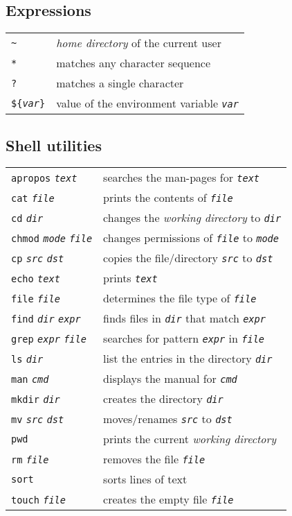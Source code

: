 \documentclass[landscape, a4paper]{article}
\newcommand{\cl}[1]{\texttt{#1}}
\newcommand{\cv}[1]{\textit{\texttt{#1}}}
\begin{document}
\begin{multicols*}{3}
\subsection*{Expressions}
\begin{tabular}{ll}
\cl{\textasciitilde} 		& \textit{home directory} of the current user\\
\cl{*} 						& matches any character sequence\\
\cl{?} 						& matches a single character\\
\cl{\$\{}\cv{var}\cl{\}}	& value of the environment variable \cv{var}
\end{tabular}

\subsection*{Shell utilities}
\begin{tabular}{ll}
\cl{apropos} \cv{text} 				& searches the man-pages for \cv{text}\\
\cl{cat} \cv{file} 				& prints the contents of \cv{file}\\
\cl{cd} \cv{dir} 				& changes the \textit{working directory} to \cv{dir}\\
\cl{chmod} \cv{mode} \cv{file} 	& changes permissions of \cv{file} to \cv{mode}\\
\cl{cp} \cv{src} \cv{dst} 		& copies the file/directory \cv{src} to \cv{dst}\\
\cl{echo} \cv{text} 			& prints \cv{text}\\
\cl{file} \cv{file} 			& determines the file type of \cv{file}\\
\cl{find} \cv{dir} \cv{expr} 	& finds files in \cv{dir} that match \cv{expr}\\
\cl{grep} \cv{expr} \cv{file} 	& searches for pattern \cv{expr} in \cv{file}\\
\cl{ls} \cv{dir} 				& list the entries in the directory \cv{dir}\\
\cl{man} \cv{cmd} 				& displays the manual for \cv{cmd}\\
\cl{mkdir} \cv{dir} 			& creates the directory \cv{dir}\\
\cl{mv} \cv{src} \cv{dst} 		& moves/renames \cv{src} to \cv{dst}\\
\cl{pwd} 						& prints the current \textit{working directory}\\
\cl{rm} \cv{file} 				& removes the file \cv{file}\\
\cl{sort} 			& sorts lines of text\\
\cl{touch} \cv{file} 			& creates the empty file \cv{file}
\end{tabular}

\end{multicols*}
\end{document}
